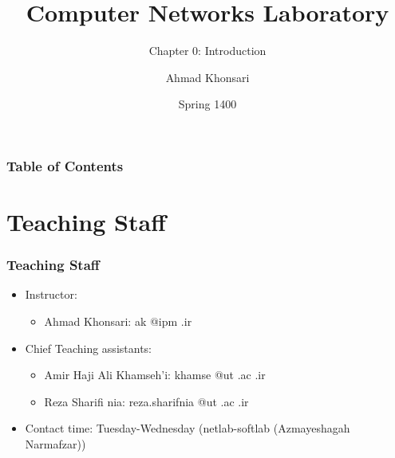 \documentclass[aspectratio=169,15pt]{beamer}
\title{Computer Networks Laboratory}
\subtitle{Chapter 0: Introduction}
\author{Ahmad Khonsari}
\institute[ECE @ UT]{
    Electrical and Computer Engineering Department\\
    Tehran University \newline
    \url{http://ece.ut.ac.ir/portal/}
}
\date{Spring 1400}
\begin{document}
\frame{\titlepage}


\begin{frame}
    \frametitle{Table of Contents}
    \tableofcontents
\end{frame}

\section{Teaching Staff}
\begin{frame}
\frametitle{Teaching Staff}
\begin{itemize}
    \item Instructor:
    \begin{itemize}
        \item Ahmad Khonsari: \alert{ak @ipm .ir}
    \end{itemize}
    \item Chief Teaching assistants:
    \begin{itemize}
        \item Amir Haji Ali Khamseh’i: \alert{khamse @ut .ac .ir}
        \item Reza Sharifi nia: \alert{reza.sharifnia @ut .ac .ir}
    \end{itemize}
    \item Contact time: Tuesday-Wednesday (netlab-softlab (Azmayeshagah Narmafzar))
\end{itemize}

\end{frame}
\end{document}
